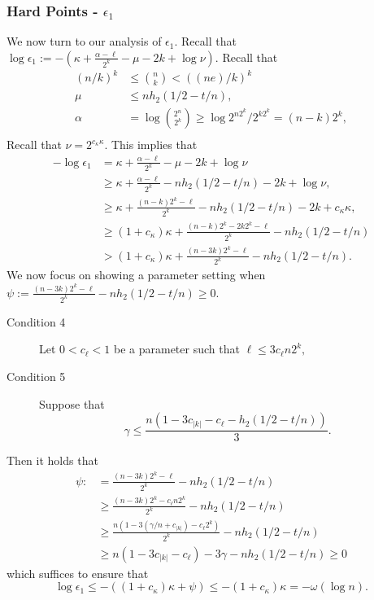 \subsubsection{Hard Points - $\epsilon_1$} 
We now turn to our analysis of $\epsilon_1$.  Recall that $\log{\epsilon_1}:= -\left(\kappa+\frac{\alpha -\ell}{2^k} - \mu -2k+\log{\nu}\right).$
Recall that 
\begin{align*}
(n/k)^k &\le {n\choose k} < ((ne)/k)^k\\
\mu&\le nh_2(1/2-t/n),\\
\alpha &= \log{2^n\choose 2^k} \ge \log{2^{n2^k} /2^{k2^k}} = (n-k)2^k,\\
\end{align*}
Recall that $\nu = 2^{c_\kappa \kappa}$.
This implies that 
\begin{align*}
-\log{\epsilon_1}&= \kappa+\frac{\alpha-\ell}{2^k} - \mu -2k+\log{\nu}\\
&\ge  \kappa+\frac{\alpha -\ell}{2^k} - nh_2(1/2-t/n) - 2k+\log{\nu},\\
&\ge  \kappa+\frac{(n-k)2^k-\ell}{2^k} - nh_2(1/2-t/n) - 2k+c_{\kappa}\kappa,\\
&\ge  (1+c_{\kappa})\kappa+\frac{(n-k)2^k-2k2^{k}-\ell}{2^k} - nh_2(1/2-t/n)\\
&>  (1+c_{\kappa})\kappa+\frac{(n-3k)2^k-\ell}{2^k} - nh_2(1/2-t/n) .
\end{align*}
\noindent
We now focus on showing a parameter setting when $\psi:=\frac{(n-3k)2^k-\ell}{2^k} - nh_2(1/2-t/n)\ge 0$.
\begin{description}
\item[Condition 4]
Let $0< c_\ell<1$ be a parameter such that 
$
\ell\le 3c_{\ell} n2^k,$
\item[Condition 5] 
Suppose that 
\[
\gamma \le \frac{n(1-3c_{|k|} -c_{\ell}- h_2(1/2-t/n))}{3}.
\]
\end{description}
\noindent
Then it holds that 
\begin{align*}
\psi:&=\frac{(n-3k)2^k-\ell}{2^k} - nh_2(1/2-t/n) \\
&\ge   \frac{(n-3k)2^k-c_{\ell}n2^k}{2^k} - nh_2(1/2-t/n)\\
&\ge   \frac{n(1-3(\gamma/n+c_{|k|}) -c_{\ell}2^k)}{2^k} - nh_2(1/2-t/n)\\
&\ge n(1-3c_{|k|}-c_{\ell}) - 3\gamma - nh_2(1/2-t/n) \ge 0
\end{align*}
which suffices to ensure that 
\[
\log{\epsilon_1} \le  -\left((1+c_{\kappa})\kappa+\psi \right) \le  -(1+c_{\kappa})\kappa = -\omega(\log{n}).
\]
